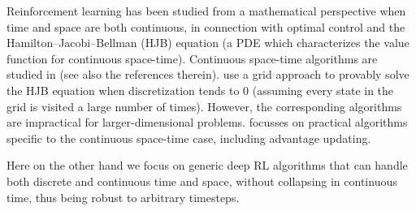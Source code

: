 
Reinforcement learning has been studied from a mathematical perspective
when time and space are both continuous, in connection with optimal
control and the Hamilton--Jacobi--Bellman (HJB) equation (a PDE which
characterizes the value function for continuous space-time). Continuous
space-time algorithms are studied in
\cite{cont_rl,MunosBourgines98} (see also the references therein).
\cite{MunosBourgines98} use a grid approach to provably solve the HJB
equation when discretization tends to $0$ (assuming every state in the
grid is visited a large number of times). However,
the corresponding algorithms are
impractical \cite{cont_rl} for larger-dimensional problems.
\cite{cont_rl} focusses on practical algorithms specific to the continuous
space-time case, including advantage updating.

Here on the other hand we focus on generic deep RL algorithms that can handle
both discrete and continuous time and space, without collapsing in
continuous time, thus being robust to arbitrary timesteps.



